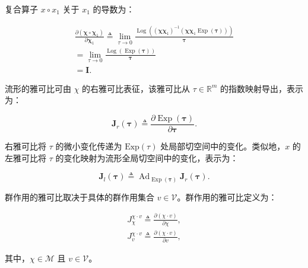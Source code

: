 复合算子 $x \circ x _ { 1 }$ 关于 $x _ { 1 }$ 的导数为：

\begin{equation}
\begin{array}{l} \frac {\partial (\boldsymbol {\chi} \circ \boldsymbol {\chi} _ {1})}{\partial \boldsymbol {\chi} _ {1}} \triangleq \lim _ {\tau \to 0} \frac {\operatorname{Log} \left((\boldsymbol {\chi} \boldsymbol {\chi} _ {1}) ^ {- 1} (\boldsymbol {\chi} \boldsymbol {\chi} _ {1} \operatorname{Exp} (\boldsymbol {\tau}))\right)}{\boldsymbol {\tau}} \\ = \lim _ {\tau \to 0} \frac {\operatorname{Log} \left(\operatorname{Exp} (\boldsymbol {\tau})\right)}{\boldsymbol {\tau}} \\ = \boldsymbol {I}. \end{array}\tag{4.34}
\end{equation}

流形的雅可比可由 $\chi$ 的右雅可比表征，该雅可比从 $\tau \in \mathbb { R } ^ { m }$ 的指数映射导出，表示为：

\begin{equation}
\boldsymbol {J} _ {r} (\boldsymbol {\tau}) \triangleq \frac {\partial \operatorname{Exp} (\boldsymbol {\tau})}{\partial \boldsymbol {\tau}}.\tag{4.35}
\end{equation}

右雅可比将 $\tau$ 的微小变化传递为 $\mathrm{Exp}(\tau)$ 处局部切空间中的变化。类似地，$x$ 的左雅可比将 $\tau$ 的变化映射为流形全局切空间中的变化，表示为：

\begin{equation}
\boldsymbol {J} _ {l} (\boldsymbol {\tau}) \triangleq \operatorname{Ad}_{\operatorname{Exp}(\boldsymbol{\tau})} \boldsymbol {J} _ {r} (\boldsymbol {\tau}).\tag{4.36}
\end{equation}

群作用的雅可比取决于具体的群作用集合 $v \in \mathcal{V}$。群作用的雅可比定义为：

\begin{equation}
\begin{array}{l} J _ {\chi} ^ {\chi \cdot v} \triangleq \frac {\partial(\chi \cdot v)}{\partial \chi}, \\ J _ {v} ^ {\chi \cdot v} \triangleq \frac {\partial(\chi \cdot v)}{\partial v}, \end{array}\tag{4.37}
\end{equation}

其中，$\chi \in \mathcal { M }$ 且 $v \in \mathcal{V}$。

